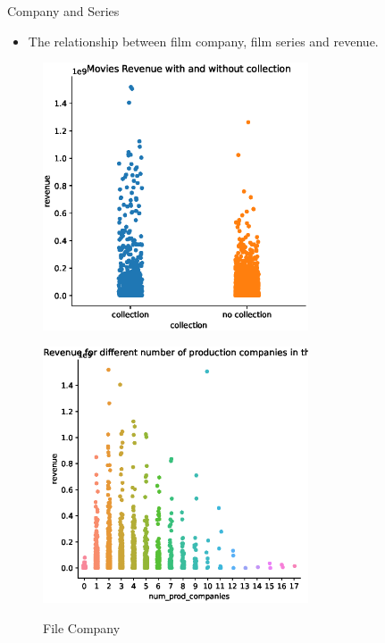 \documentclass[
 size=14pt,
 paper=smartboard,  %
 mode=present, 		%
 display=slides, 	%
 style=tuliplab,  	%
 pauseslide,
 fleqn,leqno]{powerdot}
\begin{document}
\begin{slide}[toc=,bm=]{Company and Series}
  \begin{itemize}
    \item The relationship between film company, film series and revenue.
  \end{itemize}
  \begin{figure}[htbp]
    \centering
    \begin{minipage}[t]{0.48\textwidth}
      \centering
      \includegraphics[width=0.7\textwidth]{figures//collection.eps}\\
      \vspace{-1.4em}
      \caption{File Series}
    \end{minipage}
    \begin{minipage}[t]{0.48\textwidth}
      \centering
      \includegraphics[width=0.7\textwidth]{figures//company.eps}\\
      \vspace{-1.4em}
      \caption{File Company}
    \end{minipage}
  \end{figure}
\end{slide}
\end{document}
